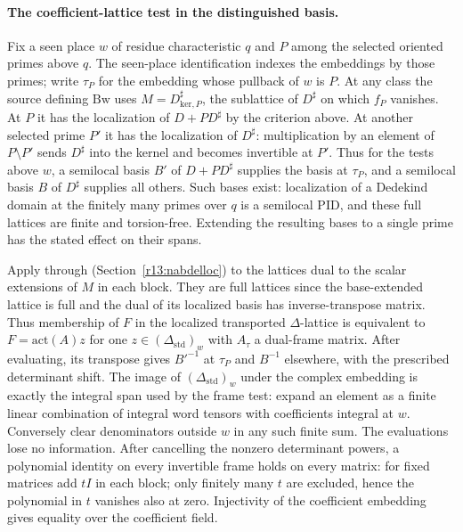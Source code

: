 \paragraph{The coefficient-lattice test in the distinguished basis.}
Fix a seen place $w$ of residue characteristic $q$ and $P$ among the
selected oriented primes above $q$. The seen-place identification indexes
the embeddings by those primes; write $\tau_P$ for the embedding whose
pullback of $w$ is $P$. At any class the source defining $\mathrm{Bw}$
uses $M=D^\sharp_{\mathrm{ker},P}$, the sublattice of $D^\sharp$
on which $f_P$ vanishes. At $P$ it has the localization of
$D+PD^\sharp$ by the criterion above.
At another selected prime $P'$ it has the localization of $D^\sharp$:
multiplication by an element of $P\setminus P'$ sends $D^\sharp$ into
the kernel and becomes invertible at $P'$. Thus for the tests above $w$,
a semilocal basis $B'$ of $D+PD^\sharp$ supplies the basis at $\tau_P$,
and a semilocal basis $B$ of $D^\sharp$ supplies all others. Such bases
exist: localization of a Dedekind domain at the finitely many primes
over $q$ is a semilocal PID, and these full lattices are finite and
torsion-free. Extending the resulting bases to a single prime has the
stated effect on their spans.

Apply  through
 (Section~\ref{r13:nabdelloc})
to the lattices dual to the scalar extensions of $M$ in each block.
They are full lattices since the base-extended lattice is full and the
dual of its localized basis has inverse-transpose matrix. Thus membership
of $F$ in the localized transported $\Delta$-lattice is equivalent to
$F=\mathrm{act}(A)z$ for one $z\in(\Delta_{\mathrm{std}})_w$ with
$A_\tau$ a dual-frame matrix. After evaluating, its transpose gives
$B'^{-1}$ at $\tau_P$ and $B^{-1}$ elsewhere, with the prescribed
determinant shift. The image of $(\Delta_{\mathrm{std}})_w$ under
the complex embedding is exactly the integral span used by the frame
test: expand an element as a finite linear combination of integral
word tensors with coefficients integral at $w$. Conversely clear
denominators outside $w$ in any such finite sum. The evaluations lose
no information. After cancelling the nonzero determinant powers,
a polynomial identity on every invertible frame holds on every
matrix: for fixed matrices add $tI$ in each block; only finitely many
$t$ are excluded, hence the polynomial in $t$ vanishes also at zero.
Injectivity of the coefficient embedding gives equality over the
coefficient field.

